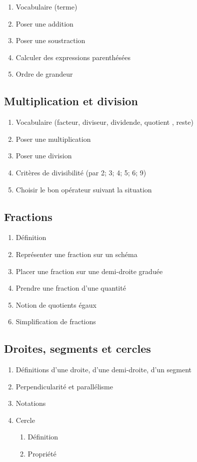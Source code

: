 \begin{enumerate}
	\item Vocabulaire (terme)
	\item Poser une addition
	\item Poser une soustraction
	\item Calculer des expressions parenthésées 
	\item Ordre de grandeur
\end{enumerate}


\subsection{Multiplication et division}\label{ch_6_multi}

\begin{enumerate}
	\item Vocabulaire (facteur, diviseur, dividende, quotient , reste)
	\item Poser une multiplication
	\item Poser une division
	\item Critères de divisibilité (par 2; 3; 4; 5; 6; 9)
	\item Choisir le bon opérateur suivant la situation
\end{enumerate}


\subsection{Fractions}\label{ch_6_frac}

\begin{enumerate}
	\item Définition
	\item Représenter une fraction sur un schéma
	\item Placer une fraction sur une demi-droite graduée
	\item Prendre une fraction d'une quantité
	\item Notion de quotients égaux
	\item Simplification de fractions
\end{enumerate}

\subsection{Droites, segments et cercles}\label{ch_6_droites}

\begin{enumerate}
	\item Définitions d'une droite, d'une demi-droite, d'un segment
	\item Perpendicularité et parallélisme
	\item Notations
	\item Cercle
		\begin{enumerate}
			\item Définition
			\item Propriété
		\end{enumerate}
\end{enumerate}

